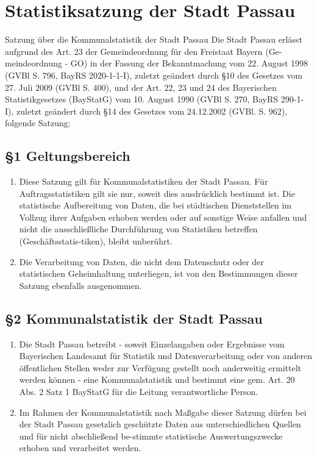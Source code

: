 \chapter{Statistiksatzung der Stadt Passau}{Satzung über die Kommunalstatistik der Stadt Passau}
\minitoc
  Die Stadt Passau erlässt aufgrund des Art. 23 der Gemeindeordnung für den Freistaat Bayern (Ge-meindeordnung - GO) in der Fassung der Bekanntmachung vom 22. August 1998 (GVBl S. 796, BayRS 2020-1-1-I), zuletzt geändert durch \S 10 des Gesetzes vom 27. Juli 2009 (GVBl S. 400), und der Art. 22, 23 und 24 des Bayerischen Statistikgesetzes (BayStatG) vom 10. August 1990 (GVBl S. 270, BayRS 290-1-I), zuletzt geändert durch \S 14 des Gesetzes vom 24.12.2002 (GVBl. S. 962), folgende Satzung:
  \section{\S1 Geltungsbereich}
    \begin{enumerate}[label=(\arabic*)]
      \item Diese Satzung gilt für Kommunalstatistiken der Stadt Passau. Für Auftragsstatistiken gilt sie nur, soweit dies ausdrücklich bestimmt ist. Die statistische Aufbereitung von Daten, die bei städtischen Dienststellen im Vollzug ihrer Aufgaben erhoben werden oder auf sonstige Weise anfallen und nicht die ausschließliche Durchführung von Statistiken betreffen (Geschäftsstatis-tiken), bleibt unberührt. 
      \item Die Verarbeitung von Daten, die nicht dem Datenschutz oder der statistischen Geheimhaltung unterliegen, ist von den Bestimmungen dieser Satzung ebenfalls ausgenommen. 
    \end{enumerate}

  \section{\S2 Kommunalstatistik der Stadt Passau}
    \begin{enumerate}[label=(\arabic*)]
      \item Die Stadt Passau betreibt - soweit Einzelangaben oder Ergebnisse vom Bayerischen Landesamt für Statistik und Datenverarbeitung oder von anderen öffentlichen Stellen weder zur Verfügung gestellt noch anderweitig ermittelt werden können - eine Kommunalstatistik und bestimmt eine gem. Art. 20 Abs. 2 Satz 1 BayStatG für die Leitung verantwortliche Person.
      \item Im Rahmen der Kommunalstatistik nach Maßgabe dieser Satzung dürfen bei der Stadt Passau gesetzlich geschützte Daten aus unterschiedlichen Quellen und für nicht abschließend be-stimmte statistische Auswertungszwecke erhoben und verarbeitet werden.
    \end{enumerate}
 

